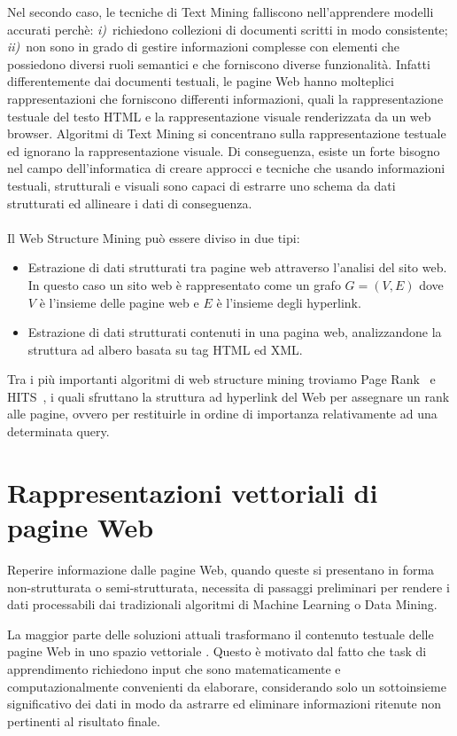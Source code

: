 Nel secondo caso, le tecniche di Text Mining falliscono nell'apprendere modelli accurati perchè: \textit{i)}~richiedono collezioni di documenti scritti in modo consistente; \textit{ii)}~non sono in grado di gestire informazioni complesse con elementi che possiedono diversi ruoli semantici e che forniscono diverse funzionalità. Infatti differentemente dai documenti testuali, le pagine Web hanno molteplici rappresentazioni che forniscono differenti informazioni, quali la rappresentazione testuale del testo HTML e la rappresentazione visuale renderizzata da un web browser. Algoritmi di Text Mining si concentrano sulla rappresentazione testuale ed ignorano la rappresentazione visuale. Di conseguenza, esiste un forte bisogno nel campo dell'informatica di creare approcci e tecniche che usando informazioni testuali, strutturali e visuali sono capaci di estrarre uno schema da dati strutturati ed allineare i dati di conseguenza.
\\\\
Il Web Structure Mining può essere diviso in due tipi:
\begin{itemize}
\item Estrazione di dati strutturati tra pagine web attraverso l'analisi del sito web. In questo caso un sito web è rappresentato come un grafo $G = (V, E)$ dove $V$ è l'insieme delle pagine web e $E$ è l'insieme degli hyperlink.

\item Estrazione di dati strutturati contenuti in una pagina web, analizzandone la struttura ad albero basata su tag HTML ed XML.
\end{itemize}
Tra i più importanti algoritmi di web structure mining troviamo Page Rank~\cite{pagerank} e HITS~\cite{Kleinberg99}, i quali sfruttano la struttura ad hyperlink del Web per assegnare un rank alle pagine, ovvero per restituirle in ordine di importanza relativamente ad una determinata query. 

\section{Rappresentazioni vettoriali di pagine Web}
Reperire informazione dalle pagine Web, quando queste si presentano in forma non-strutturata o semi-strutturata, necessita di passaggi preliminari per rendere i dati processabili dai tradizionali algoritmi di Machine Learning o Data Mining.

La maggior parte delle soluzioni attuali trasformano il contenuto testuale delle pagine Web in uno spazio vettoriale \cite{Turney10}. Questo è motivato dal fatto che task di apprendimento richiedono input che sono matematicamente e computazionalmente convenienti da elaborare, considerando solo un sottoinsieme significativo dei dati in modo da astrarre ed eliminare informazioni ritenute non pertinenti al risultato finale. 

